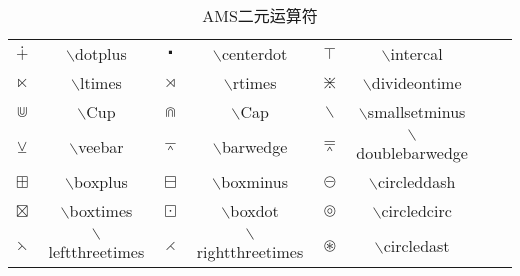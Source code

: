 \documentclass[UTF8]{ctexart}
\begin{document}
\begin{table}[H]
	\begin{center}
		\caption{AMS二元运算符}
		\begin{tabular}{cccccccc}
			
			$\dotplus$  &  $\backslash$dotplus  &  $\centerdot$  & $\backslash$centerdot  &  $\intercal$  & $\backslash$intercal  \\

			$\ltimes$  &  $\backslash$ltimes  &  $\rtimes$  & $\backslash$rtimes  &  $\divideontimes$   &  $\backslash$divideontime  \\

			$\Cup$  &  $\backslash$Cup  &  $\Cap$  & $\backslash$Cap  &  $\smallsetminus$   &  $\backslash$smallsetminus  \\			

			$\veebar$  &  $\backslash$veebar  &  $\barwedge$  & $\backslash$barwedge  &  $\doublebarwedge$  & $\backslash$doublebarwedge  \\

			$\boxplus$  &  $\backslash$boxplus  &  $\boxminus$  & $\backslash$boxminus  &  $\circleddash$  & $\backslash$circleddash  \\

			$\boxtimes$  &  $\backslash$boxtimes  &  $\boxdot$  & $\backslash$boxdot  &  $\circledcirc$  & $\backslash$circledcirc  \\


			$\leftthreetimes$  &  $\backslash$leftthreetimes  &  $\rightthreetimes$  & $\backslash$rightthreetimes  &  $\circledast$  & $\backslash$circledast  \\



		\end{tabular}
	\end{center}
\end{table}
\end{document}
